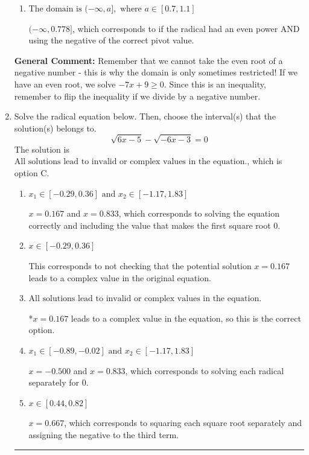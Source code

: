 \documentclass{extbook}[14pt]
\newcommand{\litem}[1]{\item #1

\rule{\textwidth}{0.4pt}}
\begin{document}
\begin{enumerate}
{\begin{enumerate}[label=\Alph*.]
$[0.778, \infty)$, which corresponds to if the radical had an even power AND reversing the direction of the domain AND using the negative of the correct pivot value.
\item \( \text{The domain is } (-\infty, a], \text{   where } a \in [0.7, 1.1] \)

$(-\infty, 0.778]$, which corresponds to if the radical had an even power AND using the negative of the correct pivot value.
\end{enumerate}

\textbf{General Comment:} Remember that we cannot take the even root of a negative number - this is why the domain is only sometimes restricted! If we have an even root, we solve $-7 x + 9 \geq 0$. Since this is an inequality, remember to flip the inequality if we divide by a negative number.
}
\litem{
Solve the radical equation below. Then, choose the interval(s) that the solution(s) belongs to.
\[ \sqrt{6 x - 5} - \sqrt{-6 x - 3} = 0 \]
The solution is \( \text{All solutions lead to invalid or complex values in the equation.} \), which is option C.\begin{enumerate}[label=\Alph*.]
\item \( x_1 \in [-0.29, 0.36] \text{ and } x_2 \in [-1.17,1.83] \)

$x = 0.167$ and $x = 0.833$, which corresponds to solving the equation correctly and including the value that makes the first square root 0.
\item \( x \in [-0.29,0.36] \)

This corresponds to not checking that the potential solution $x = 0.167$ leads to a complex value in the original equation.
\item \( \text{All solutions lead to invalid or complex values in the equation.} \)

*$x = 0.167$ leads to a complex value in the equation, so this is the correct option.
\item \( x_1 \in [-0.89, -0.02] \text{ and } x_2 \in [-1.17,1.83] \)

$x = -0.500$ and $x = 0.833$, which corresponds to solving each radical separately for 0.
\item \( x \in [0.44,0.82] \)

$x = 0.667$, which corresponds to squaring each square root separately and assigning the negative to the third term.
\end{enumerate}

}
\end{enumerate}
\end{document}

